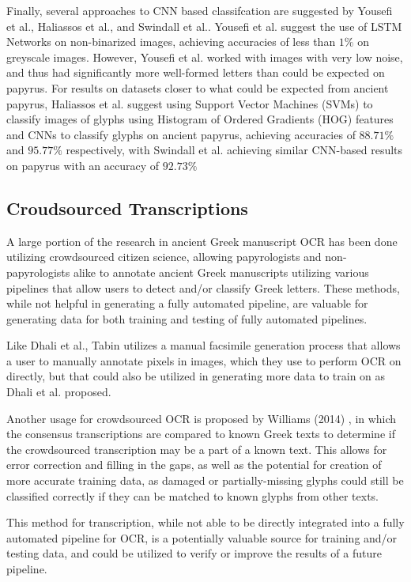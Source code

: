 Finally, several approaches to CNN based classifcation are suggested by Yousefi et al.\cite{Yousefi}, Haliassos et al.\cite{Haliassos}, and Swindall et al.\cite{Swindall}. Yousefi et al. suggest the use of LSTM Networks on non-binarized images, achieving accuracies of less than $1\%$ on greyscale images. However, Yousefi et al. worked with images with very low noise, and thus had significantly more well-formed letters than could be expected on papyrus. For results on datasets closer to what could be expected from ancient papyrus, Haliassos et al.\cite{Haliassos} suggest using Support Vector Machines (SVMs) to classify images of glyphs using Histogram of Ordered Gradients (HOG) features and CNNs to classify glyphs on ancient papyrus, achieving accuracies of $88.71\%$ and $95.77\%$ respectively, with Swindall et al.\cite{Swindall} achieving similar CNN-based results on papyrus with an accuracy of $92.73\%$

\subsection{Croudsourced Transcriptions}
A large portion of the research in ancient Greek manuscript OCR has been done utilizing crowdsourced citizen science, allowing papyrologists and non-papyrologists alike to annotate ancient Greek manuscripts utilizing various pipelines that allow users to detect and/or classify Greek letters.\cite{Williams2014, Williams2015, Tabin, Atanasiu} These methods, while not helpful in generating a fully automated pipeline, are valuable for generating data for both training and testing of fully automated pipelines.

Like Dhali et al.\cite{Dhali2019}, Tabin\cite{Tabin} utilizes a manual facsimile generation process that allows a user to manually annotate pixels in images, which they use to perform OCR on directly, but that could also be utilized in generating more data to train on as Dhali et al.\cite{Dhali2019} proposed.

Another usage for crowdsourced OCR is proposed by Williams (2014) \cite{Williams2014}, in which the consensus transcriptions are compared to known Greek texts to determine if the crowdsourced transcription may be a part of a known text. This allows for error correction and filling in the gaps, as well as the potential for creation of more accurate training data, as damaged or partially-missing glyphs could still be classified correctly if they can be matched to known glyphs from other texts.

This method for transcription, while not able to be directly integrated into a fully automated pipeline for OCR, is a potentially valuable source for training and/or testing data, and could be utilized to verify or improve the results of a future pipeline.
